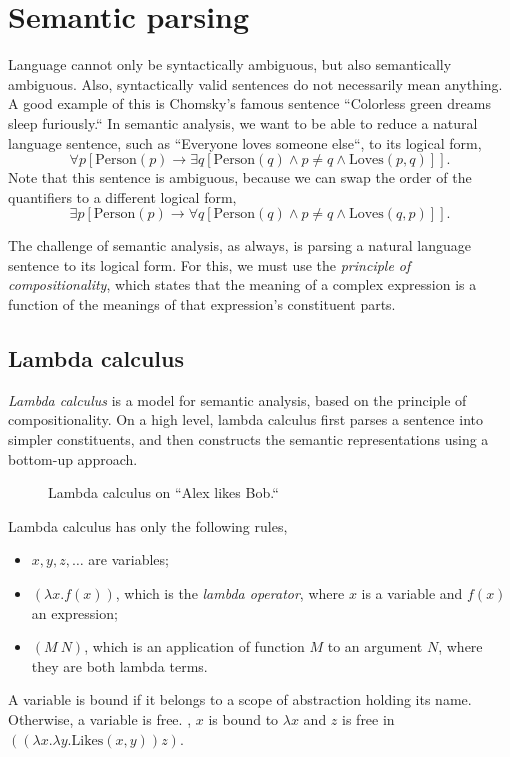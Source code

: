 \section{Semantic parsing} \label{sec:semantic_parsing}

Language cannot only be syntactically ambiguous, but also semantically
ambiguous. Also, syntactically valid sentences do not necessarily mean anything.
A good example of this is Chomsky's famous sentence ``Colorless green dreams
sleep furiously.`` In semantic analysis, we want to be able to reduce a natural
language sentence, such as ``Everyone loves someone else``, to its logical form,
\[
  \forall p [ \mathrm{Person}(p) \to \exists q [ \mathrm{Person}(q) \land p \neq
  q \land \mathrm{Loves}(p, q) ]]
.\]
Note that this sentence is ambiguous, because we can swap the order of the
quantifiers to a different logical form, \[
  \exists p [ \mathrm{Person}(p) \to \forall q [ \mathrm{Person}(q) \land p \neq
  q \land \mathrm{Loves}(q, p) ]]
.\]

The challenge of semantic analysis, as always, is parsing a natural language
sentence to its logical form. For this, we must use the \textit{principle of
compositionality}, which states that the meaning of a complex expression is a
function of the meanings of that expression's constituent parts.

\subsection{Lambda calculus}

\textit{Lambda calculus} \citep{church1932set} is a model for semantic
analysis, based on the principle of compositionality. On a high level, lambda
calculus first parses a sentence into simpler constituents, and then constructs
the semantic representations using a bottom-up approach.

\begin{figure}[h!]
  \centering
  \caption{Lambda calculus on ``Alex likes Bob.``}
  \label{fig:lambda-calculus-example}
\end{figure}

Lambda calculus has only the following rules,
\begin{itemize}
  \item $x,y,z,\ldots$ are variables;
  \item $(\lambda x. f(x))$, which is the \textit{lambda operator}, where $x$ is
    a variable and $f(x)$ an expression;
  \item $(M\:N)$, which is an application of function $M$ to an argument $N$,
    where they are both lambda terms.
\end{itemize}
A variable is bound if it belongs to a scope of abstraction holding its name.
Otherwise, a variable is free. \Eg, $x$ is bound to $\lambda x$ and $z$ is free
in $((\lambda x. \lambda y.  \mathrm{Likes}(x,y)) z)$.

